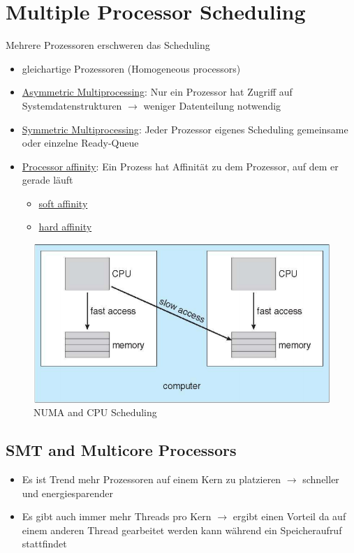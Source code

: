 \documentclass[a4paper]{scrreprt}
\begin{document}
\section{Multiple Processor Scheduling}
Mehrere Prozessoren erschweren das Scheduling
\begin{itemize}
\item gleichartige Prozessoren (Homogeneous processors)
\item \underline{Asymmetric Multiprocessing}: Nur ein Prozessor hat Zugriff auf Systemdatenstrukturen $\rightarrow$ weniger Datenteilung notwendig
\item \underline{Symmetric Multiprocessing}: Jeder Prozessor eigenes Scheduling gemeinsame oder einzelne Ready-Queue
\item \underline{Processor affinity}: Ein Prozess hat Affinität zu dem Prozessor, auf dem er gerade läuft
\begin{itemize}
\item \underline{soft affinity}
\item \underline{hard affinity}
\end{itemize}
\end{itemize}
\begin{figure}[htb]
\includegraphics[scale = 0.4]{graphics/numa.png}
\caption{NUMA and CPU Scheduling}
\end{figure}
\subsection{SMT and Multicore Processors}
\begin{itemize}
\item Es ist Trend mehr Prozessoren auf einem Kern zu platzieren $\rightarrow$ schneller und energiesparender
\item Es gibt auch immer mehr Threads pro Kern $\rightarrow$ ergibt einen Vorteil da auf einem anderen Thread gearbeitet werden kann während ein Speicheraufruf stattfindet
\end{itemize}
\end{document}
